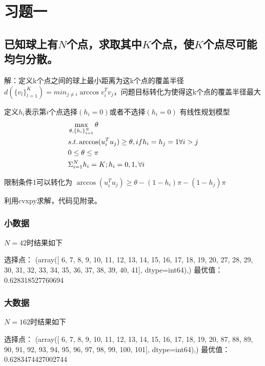 \section{习题一}
\subsection{已知球上有$N$个点，求取其中$K$个点，使$K$个点尽可能均匀分散。}

解：定义k个点之间的球上最小距离为这k个点的覆盖半径$d(\{v_l\}^K_{l=1}) = min_{j \neq i} \arccos v_i^Tv_j$，问题目标转化为使得这k个点的覆盖半径最大

定义$h_i$表示第$i$个点选择$(h_i=0)$或者不选择$(h_i = 0)$
有线性规划模型
\begin{equation}
    \begin{aligned}
        &\max_{\theta, \{h_i\}^N_{i=1}}  \theta\\
        &s.t. \space \arccos(u_i^Tu_j) \ge \theta, if \space h_i=h_j=1 \space \forall i > j\\      
        &0 \le \theta \le \pi\\
        & \Sigma^{N}_{i=1} h_i = K; h_i = 0,1 , \forall i
    \end{aligned}
\end{equation}

限制条件1可以转化为
$\arccos(u_i^Tu_j) \ge \theta - (1-h_i)\pi - (1-h_j)\pi $

利用cvxpy求解，代码见附录。
\subsubsection{小数据}
$N=42$时结果如下

\begin{python}
选择点： (array([ 6,  7,  8,  9, 10, 11, 12, 13, 14, 15, 16, 17, 18, 19, 20, 27, 28,
       29, 30, 31, 32, 33, 34, 35, 36, 37, 38, 39, 40, 41], dtype=int64),)
最优值： 0.628318527760694
\end{python}
\subsubsection{大数据}
$N=162$时结果如下
\begin{python}
    选择点： (array([  6,   7,   8,   9,  10,  11,  12,  13,  14,  15,  16,  17,  18,
        19,  20,  87,  88,  89,  90,  91,  92,  93,  94,  95,  96,  97,
        98,  99, 100, 101], dtype=int64),)
最优值： 0.6283474427002744
\end{python}

